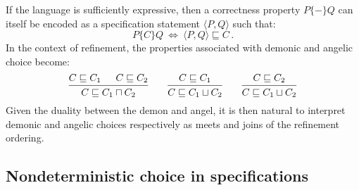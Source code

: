 \documentclass[11pt,oneside]{book}
\theoremstyle{definition}
\newcommand{\htr}[3]{{ {#1} \lbrace {#2} \rbrace {#3} }}
\begin{document}
If the language is sufficiently expressive,
then a correctness property $\htr{P}{-}{Q}$
can itself be encoded \citep{specstm} as
a specification statement $\langle{}P,Q{}\rangle$
such that:
\[
    \htr{P}{C}{Q} \: \Leftrightarrow \:
    \langle{}P,Q{}\rangle \sqsubseteq C \,.
\]
In the context of refinement,
the properties associated with demonic and angelic choice
become:
\[
  \begin{prooftree}
    \hypo{C \sqsubseteq C_1}
    \hypo{C \sqsubseteq C_2}
    \infer2{C \sqsubseteq C_1 \sqcap C_2}
  \end{prooftree}
  \qquad
  \begin{prooftree}
    \hypo{C \sqsubseteq C_1}
    \infer1{C \sqsubseteq C_1 \sqcup C_2}
  \end{prooftree}
  \qquad
  \begin{prooftree}
    \hypo{C \sqsubseteq C_2}
    \infer1{C \sqsubseteq C_1 \sqcup C_2}
  \end{prooftree}
\]
Given the duality between the demon and angel,
it is then natural to interpret demonic and angelic choices
respectively as meets and joins
of the refinement ordering.

\subsection{Nondeterministic choice in specifications}
\end{document}
